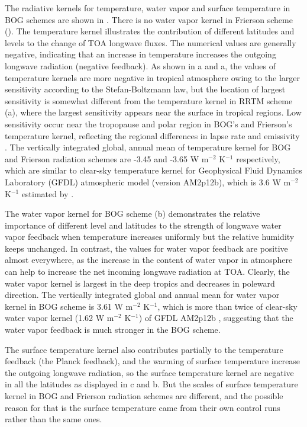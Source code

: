 The radiative kernels for temperature, water vapor and surface temperature in BOG schemes are shown in . There is no water vapor kernel in Frierson scheme (). The temperature kernel illustrates the contribution of different latitudes and levels to the change of TOA longwave fluxes. The numerical values are generally negative, indicating that an increase in temperature increases the outgoing longwave radiation (negative feedback). As shown in a and a, the values of temperature kernels are more negative in tropical atmosphere owing to the larger sensitivity according to the Stefan-Boltzmann law, but the location of largest sensitivity is somewhat different from the temperature kernel in RRTM scheme (a), where the largest sensitivity appears near the surface in tropical regions. Low sensitivity occur near the tropopause and polar region in BOG's and Frierson's temperature kernel, reflecting the regional differences in lapse rate and emissivity \citep{Soden2008}. The vertically integrated global, annual mean of temperature kernel for BOG and Frierson radiation schemes are -3.45 and -3.65 W m$^{-2}$ K$^{-1}$ respectively, which are similar to clear-sky temperature kernel for Geophysical Fluid Dynamics Laboratory (GFDL) atmospheric model (version AM2p12b), which is 3.6 W m$^{-2}$ K$^{-1}$ estimated by \cite{Soden2008}.

The water vapor kernel for BOG scheme (b) demonstrates the relative importance of different level and latitudes to the strength of longwave water vapor feedback when temperature increases uniformly but the relative humidity keeps unchanged. In contrast, the values for water vapor feedback are positive almost everywhere, as the increase in the content of water vapor in atmosphere can help to increase the net incoming longwave radiation at TOA. Clearly, the water vapor kernel is largest in the deep tropics and decreases in poleward direction. The vertically integrated global and annual mean for water vapor kernel in BOG scheme is 3.61 W m$^{-2}$ K$^{-1}$, which is more than twice of clear-sky water vapor kernel (1.62 W m$^{-2}$ K$^{-1}$) of GFDL AM2p12b \citep{Soden2008}, suggesting that the water vapor feedback is much stronger in the BOG scheme.

The surface temperature kernel also contributes partially to the temperature feedback (the Planck feedback), and the warming of surface temperature increase the outgoing longwave radiation, so the surface temperature kernel are negative in all the latitudes as displayed in c and b. But the scales of surface temperature kernel in BOG and Frierson radiation schemes are different, and the possible reason for that is the surface temperature came from their own control runs rather than the same ones.

